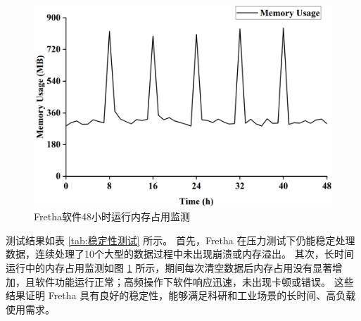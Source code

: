 \begin{figure}[hbtp]
  \centering
  \includegraphics[width=0.6\linewidth]{../figures/4/4_48小时内存占用变化.png}
  \caption{Fretha软件48小时运行内存占用监测}
  \label{fig:48小时内存变化}
\end{figure}

测试结果如表 \ref{tab:稳定性测试} 所示。
首先，Fretha 在压力测试下仍能稳定处理数据，连续处理了10个大型的数据过程中未出现崩溃或内存溢出。
其次，长时间运行中的内存占用监测如图 \ref{fig:48小时内存变化} 所示，期间每次清空数据后内存占用没有显著增加，且软件功能运行正常；高频操作下软件响应迅速，未出现卡顿或错误。
这些结果证明 Fretha 具有良好的稳定性，能够满足科研和工业场景的长时间、高负载使用需求。
